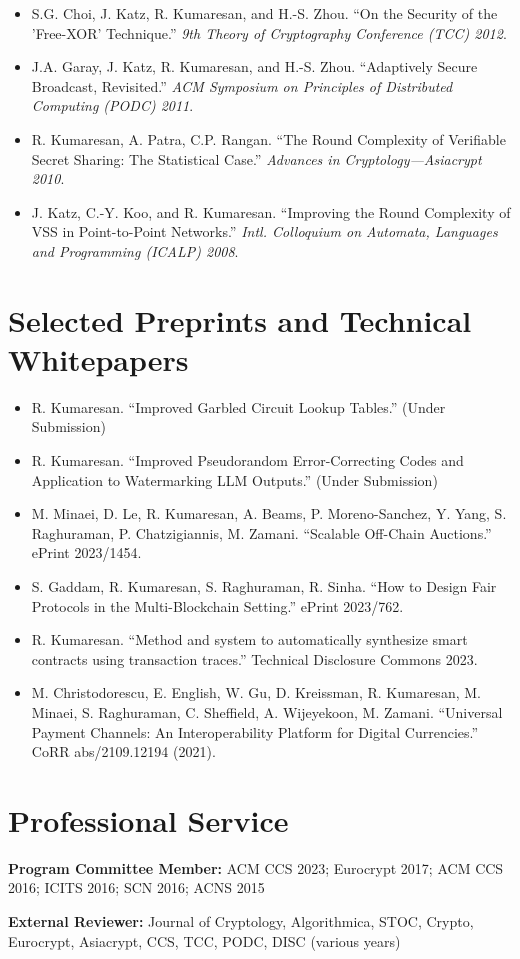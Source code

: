 \documentclass[11pt]{article}
\begin{document}
\begin{itemize}[leftmargin=*, noitemsep, topsep=0pt]
    \item S.G. Choi, J. Katz, R. Kumaresan, and H.-S. Zhou. ``On the Security of the 'Free-XOR' Technique.'' \textit{9th Theory of Cryptography Conference (TCC) 2012}.
    \item J.A. Garay, J. Katz, R. Kumaresan, and H.-S. Zhou. ``Adaptively Secure Broadcast, Revisited.'' \textit{ACM Symposium on Principles of Distributed Computing (PODC) 2011}.
    \item R. Kumaresan, A. Patra, C.P. Rangan. ``The Round Complexity of Verifiable Secret Sharing: The Statistical Case.'' \textit{Advances in Cryptology—Asiacrypt 2010}.
    \item J. Katz, C.-Y. Koo, and R. Kumaresan. ``Improving the Round Complexity of VSS in Point-to-Point Networks.'' \textit{Intl. Colloquium on Automata, Languages and Programming (ICALP) 2008}.
\end{itemize}

\section{Selected Preprints and Technical Whitepapers}
\begin{itemize}[leftmargin=*, noitemsep, topsep=0pt]
    \item R. Kumaresan. ``Improved Garbled Circuit Lookup Tables.'' (Under Submission)
    \item R. Kumaresan. ``Improved Pseudorandom Error-Correcting Codes and Application to Watermarking LLM Outputs.'' (Under Submission)
    \item M. Minaei, D. Le, R. Kumaresan, A. Beams, P. Moreno-Sanchez, Y. Yang, S. Raghuraman, P. Chatzigiannis, M. Zamani. ``Scalable Off-Chain Auctions.'' ePrint 2023/1454.
    \item S. Gaddam, R. Kumaresan, S. Raghuraman, R. Sinha. ``How to Design Fair Protocols in the Multi-Blockchain Setting.'' ePrint 2023/762.
    \item R. Kumaresan. ``Method and system to automatically synthesize smart contracts using transaction traces.'' Technical Disclosure Commons 2023.
    \item M. Christodorescu, E. English, W. Gu, D. Kreissman, R. Kumaresan, M. Minaei, S. Raghuraman, C. Sheffield, A. Wijeyekoon, M. Zamani. ``Universal Payment Channels: An Interoperability Platform for Digital Currencies.'' CoRR abs/2109.12194 (2021).
\end{itemize}

\section{Professional Service}
\textbf{Program Committee Member:} ACM CCS 2023; Eurocrypt 2017; ACM CCS 2016; ICITS 2016; SCN 2016; ACNS 2015

\textbf{External Reviewer:} Journal of Cryptology, Algorithmica, STOC, Crypto, Eurocrypt, Asiacrypt, CCS, TCC, PODC, DISC (various years)
\end{document}
